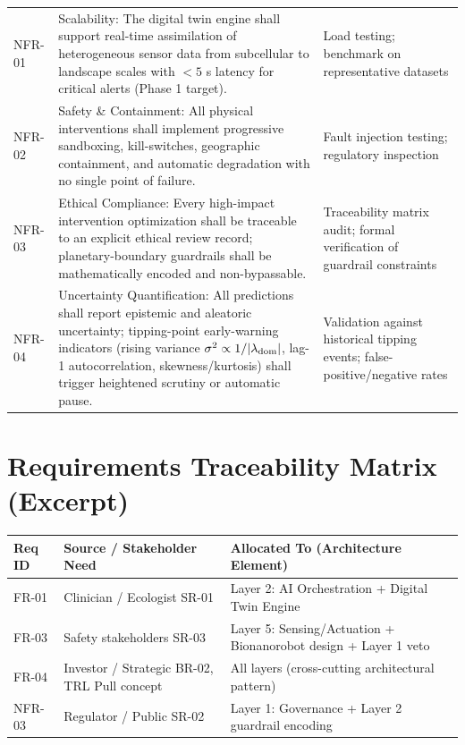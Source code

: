 \documentclass[11pt,a4paper]{report}
\begin{document}
\begin{longtable}{>{\raggedright\arraybackslash}p{2cm} >{\raggedright\arraybackslash}p{9cm} p{2.5cm}}
NFR-01 & Scalability: The digital twin engine shall support real-time assimilation of heterogeneous sensor data from subcellular to landscape scales with $< 5$ s latency for critical alerts (Phase 1 target). & Load testing; benchmark on representative datasets \\
NFR-02 & Safety \& Containment: All physical interventions shall implement progressive sandboxing, kill-switches, geographic containment, and automatic degradation with no single point of failure. & Fault injection testing; regulatory inspection \\
NFR-03 & Ethical Compliance: Every high-impact intervention optimization shall be traceable to an explicit ethical review record; planetary-boundary guardrails shall be mathematically encoded and non-bypassable. & Traceability matrix audit; formal verification of guardrail constraints \\
NFR-04 & Uncertainty Quantification: All predictions shall report epistemic and aleatoric uncertainty; tipping-point early-warning indicators (rising variance $\sigma^2 \propto 1/|\lambda_{\rm dom}|$, lag-1 autocorrelation, skewness/kurtosis) shall trigger heightened scrutiny or automatic pause. & Validation against historical tipping events; false-positive/negative rates \\
\end{longtable}

\section{Requirements Traceability Matrix (Excerpt)}

\begin{tabular}{lll}
\toprule
\textbf{Req ID} & \textbf{Source / Stakeholder Need} & \textbf{Allocated To (Architecture Element)} \\
\midrule
FR-01 & Clinician / Ecologist SR-01 & Layer 2: AI Orchestration + Digital Twin Engine \\
FR-03 & Safety stakeholders SR-03 & Layer 5: Sensing/Actuation + Bionanorobot design + Layer 1 veto \\
FR-04 & Investor / Strategic BR-02, TRL Pull concept & All layers (cross-cutting architectural pattern) \\
NFR-03 & Regulator / Public SR-02 & Layer 1: Governance + Layer 2 guardrail encoding \\
\bottomrule
\end{tabular}

\end{document}

